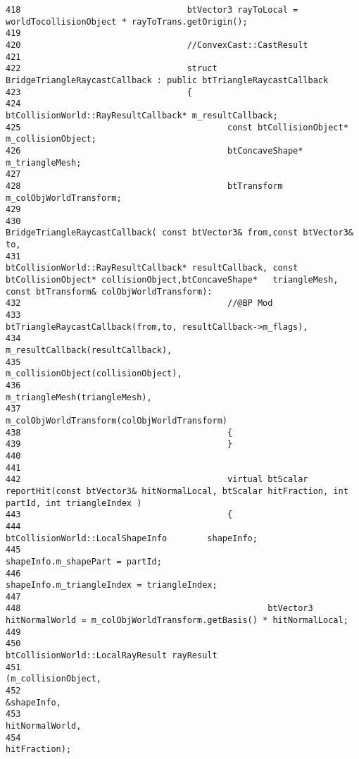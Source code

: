 \begin{Code}
\begin{verbatim}
418                                 btVector3 rayToLocal = worldTocollisionObject * rayToTrans.getOrigin();
419 
420                                 //ConvexCast::CastResult
421 
422                                 struct BridgeTriangleRaycastCallback : public btTriangleRaycastCallback
423                                 {
424                                         btCollisionWorld::RayResultCallback* m_resultCallback;
425                                         const btCollisionObject*        m_collisionObject;
426                                         btConcaveShape* m_triangleMesh;
427 
428                                         btTransform m_colObjWorldTransform;
429 
430                                         BridgeTriangleRaycastCallback( const btVector3& from,const btVector3& to,
431                                                 btCollisionWorld::RayResultCallback* resultCallback, const btCollisionObject* collisionObject,btConcaveShape*   triangleMesh, const btTransform& colObjWorldTransform):
432                                         //@BP Mod
433                                         btTriangleRaycastCallback(from,to, resultCallback->m_flags),
434                                                 m_resultCallback(resultCallback),
435                                                 m_collisionObject(collisionObject),
436                                                 m_triangleMesh(triangleMesh),
437                                                 m_colObjWorldTransform(colObjWorldTransform)
438                                         {
439                                         }
440 
441 
442                                         virtual btScalar reportHit(const btVector3& hitNormalLocal, btScalar hitFraction, int partId, int triangleIndex )
443                                         {
444                                                 btCollisionWorld::LocalShapeInfo        shapeInfo;
445                                                 shapeInfo.m_shapePart = partId;
446                                                 shapeInfo.m_triangleIndex = triangleIndex;
447 
448                                                 btVector3 hitNormalWorld = m_colObjWorldTransform.getBasis() * hitNormalLocal;
449 
450                                                 btCollisionWorld::LocalRayResult rayResult
451                                                         (m_collisionObject,
452                                                         &shapeInfo,
453                                                         hitNormalWorld,
454                                                         hitFraction);

\end{verbatim}
\end{Code}
